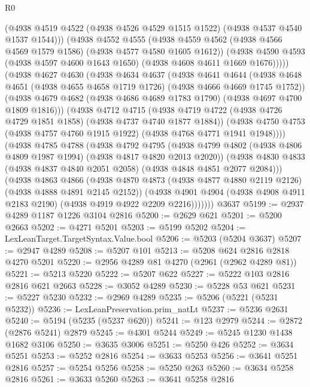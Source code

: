 \begin{lexlean}{R0}
\begin{coremodule}
              (@4938 @4519 @4522 (@4938 @4526 @4529 @1515 @1522) (@4938 @4537 @4540 @1537 @1544)))
            (@4938
              @4552
              @4555
              (@4938 @4559 @4562 (@4938 @4566 @4569 @1579 @1586) (@4938 @4577 @4580 @1605 @1612))
              (@4938 @4590 @4593 (@4938 @4597 @4600 @1643 @1650) (@4938 @4608 @4611 @1669 @1676)))))
        (@4938
          @4627
          @4630
          (@4938
            @4634
            @4637
            (@4938
              @4641
              @4644
              (@4938 @4648 @4651 (@4938 @4655 @4658 @1719 @1726) (@4938 @4666 @4669 @1745 @1752))
              (@4938 @4679 @4682 (@4938 @4686 @4689 @1783 @1790) (@4938 @4697 @4700 @1809 @1816)))
            (@4938
              @4712
              @4715
              (@4938 @4719 @4722 (@4938 @4726 @4729 @1851 @1858) (@4938 @4737 @4740 @1877 @1884))
              (@4938 @4750 @4753 (@4938 @4757 @4760 @1915 @1922) (@4938 @4768 @4771 @1941 @1948))))
          (@4938
            @4785
            @4788
            (@4938
              @4792
              @4795
              (@4938 @4799 @4802 (@4938 @4806 @4809 @1987 @1994) (@4938 @4817 @4820 @2013 @2020))
              (@4938 @4830 @4833 (@4938 @4837 @4840 @2051 @2058) (@4938 @4848 @4851 @2077 @2084)))
            (@4938
              @4863
              @4866
              (@4938 @4870 @4873 (@4938 @4877 @4880 @2119 @2126) (@4938 @4888 @4891 @2145 @2152))
              (@4938
                @4901
                @4904
                (@4938 @4908 @4911 @2183 @2190)
                (@4938 @4919 @4922 @2209 @2216)))))))
    @3637
@5199 := @2937 @4289 @1187 @1226 @3104 @2816
@5200 := @2629 @621
@5201 := @5200 @2663
@5202 := @4271 @5201
@5203 := @5199 @5202
@5204 := LexLeanTarget.TargetSyntax.Value.bool
@5206 := @5203 (@5204 @3637)
@5207 := @2947 @4289
@5208 := @5207 @101
@5213 := @5208 @624 @2816 @2818 @4270 @5201
@5220 := @2956 @4289 @81 @4270 (@2961 (@2962 @4289 @81))
@5221 := @5213 @5220
@5222 := @5207 @622
@5227 := @5222 @103 @2816 @2816 @621 @2663
@5228 := @3052 @4289
@5230 := @5228 @53 @621
@5231 := @5227 @5230
@5232 := @2969 @4289
@5235 := @5206 (@5221 (@5231 @5232))
@5236 := LexLeanPreservation.prim_natLt
@5237 := @5236 @2631
@5240 := @5194 (@5235 (@5237 @620))
@5241 := @123 @2979
@5244 := @2872 (@2876 @5241) @2879
@5245 := @4301 @5244
@5249 := @5245 @1230 @1438 @1682 @3106
@5250 := @3635 @3006
@5251 := @5250 @426
@5252 := @3634 @5251
@5253 := @5252 @2816
@5254 := @3633 @5253
@5256 := @3641 @5251 @2816
@5257 := @5254 @5256
@5258 := @5250 @263
@5260 := @3634 @5258 @2816
@5261 := @3633 @5260
@5263 := @3641 @5258 @2816

\end{coremodule}
\end{lexlean}

